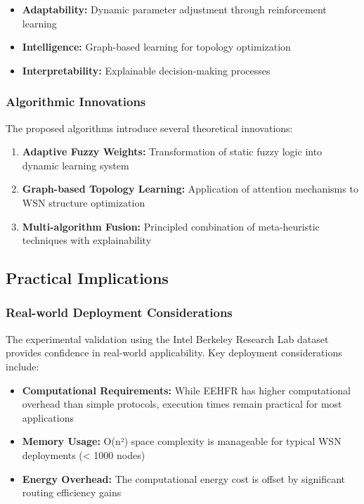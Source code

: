 \documentclass[conference]{IEEEtran}
\begin{document}
\begin{itemize}
    \item \textbf{Adaptability:} Dynamic parameter adjustment through reinforcement learning
    \item \textbf{Intelligence:} Graph-based learning for topology optimization
    \item \textbf{Interpretability:} Explainable decision-making processes
\end{itemize}

\subsubsection{Algorithmic Innovations}

The proposed algorithms introduce several theoretical innovations:

\begin{enumerate}
    \item \textbf{Adaptive Fuzzy Weights:} Transformation of static fuzzy logic into dynamic learning system
    \item \textbf{Graph-based Topology Learning:} Application of attention mechanisms to WSN structure optimization
    \item \textbf{Multi-algorithm Fusion:} Principled combination of meta-heuristic techniques with explainability
\end{enumerate}

\subsection{Practical Implications}

\subsubsection{Real-world Deployment Considerations}

The experimental validation using the Intel Berkeley Research Lab dataset provides confidence in real-world applicability. Key deployment considerations include:

\begin{itemize}
    \item \textbf{Computational Requirements:} While EEHFR has higher computational overhead than simple protocols, execution times remain practical for most applications
    \item \textbf{Memory Usage:} O(n²) space complexity is manageable for typical WSN deployments (< 1000 nodes)
    \item \textbf{Energy Overhead:} The computational energy cost is offset by significant routing efficiency gains
\end{itemize}
\end{document}
